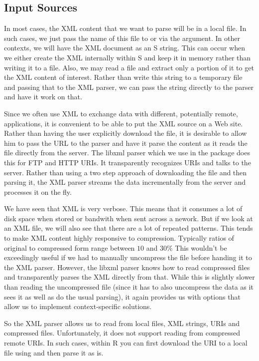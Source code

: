 \subsection{Input Sources}
In most cases, the XML content that we want to parse will be in a
local file.  In such cases, we just pass the name of this file to
 or  via the
 argument.  In other contexts, we will have the XML
document as an S string. This can occur when we either create the XML
internally within S and keep it in memory rather than writing it to a
file.  Also, we may read a file and extract only a portion of it to
get the XML content of interest.  Rather than write this string to a
temporary file and passing that to the XML parser, we can pass the
string directly to the parser and have it work on that.

Since we often use XML to exchange data with different, potentially
remote, applications, it is convenient to be able to put the XML
source on a Web site. Rather than having the user explicitly download
the file, it is desirable to allow him to pass the URL to the parser and
have it parse the content as it reads the file directly from the
server. The libxml parser which we use in the  package
does this for FTP and HTTP URIs.  It transparently recognizes URIs and
talks to the server. Rather than using a two step approach of
downloading the file and then parsing it, the XML parser streams the
data incrementally from the server and processes it on the fly.

We have seen that XML is very verbose. This means that it consumes a
lot of disk space when stored or bandwith when sent across a nework.
But if we look at an XML file, we will also see that there are a lot
of repeated patterns.  This tends to make XML content highly
responsive to compression.  Typically ratios of original to compressed
form range between $10$ and $30$\% This wouldn't be exceedingly useful
if we had to manually uncompress the file before handing it to the XML
parser.  However, the libxml parser knows how to read compressed files
and transparently parses the XML directly from that.  While this is
slightly slower than reading the uncompressed file (since it has to
also uncompress the data as it sees it as well as do the usual
parsing), it again provides us with options that allow us to implement
context-specific solutions.

So the XML parser allows us to read from local files, XML strings,
URIs and compressed files.  Unfortunately, it does not support reading
from compressed remote URIs. In such cases, within R you can first
download the URI to a local file using  and
then parse it as is.

